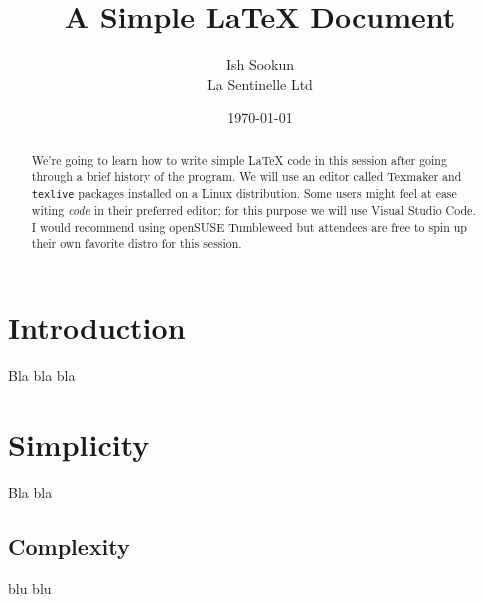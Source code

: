 \documentclass{article}
\title{A Simple {\LaTeX} Document}
\author{Ish Sookun\\ La Sentinelle Ltd}
\date{\today}
\begin{document}
    \maketitle

    \begin{abstract}
        We're going to learn how to write simple {\LaTeX} code in this session after going through a brief history of the program. We will use an editor called Texmaker and {\tt texlive} packages installed on a Linux distribution. Some users might feel at ease witing {\em code} in their preferred editor; for this purpose we will use Visual Studio Code.\\

        I would recommend using openSUSE Tumbleweed but attendees are free to spin up their own favorite distro for this session.
    \end{abstract}
    \tableofcontents

    \section{Introduction}

    Bla bla bla

    \section{Simplicity}
     Bla bla
    \subsection{Complexity}

    blu blu
    
    
\end{document}
